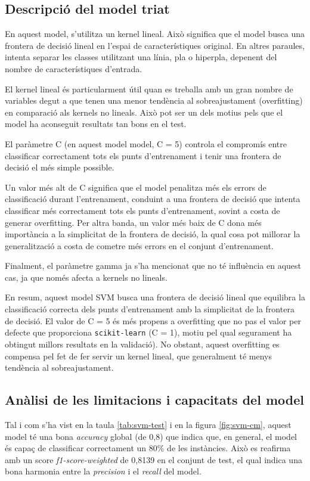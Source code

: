 \subsection{Descripció del model triat}
En aquest model, s'utilitza un kernel lineal. Això significa que el model busca una frontera de decisió lineal en l'espai de característiques original. En altres paraules, intenta separar les classes utilitzant una línia, pla o hiperpla, depenent del nombre de característiques d'entrada.

El kernel lineal és particularment útil quan es treballa amb un gran nombre de variables degut a que tenen una menor tendència al sobreajustament (overfitting) en comparació als kernels no lineals. Això pot ser un dels motius pels que el model ha aconseguit resultats tan bons en el test.

El paràmetre C (en aquest model model, C = 5) controla el compromís entre classificar correctament tots els punts d'entrenament i tenir una frontera de decisió el més simple possible.

Un valor més alt de C significa que el model penalitza més els errors de classificació durant l'entrenament, conduint a una frontera de decisió que intenta classificar més correctament tots els punts d'entrenament, sovint a costa de generar overfitting. Per altra banda, un valor més baix de C dona més importància a la simplicitat de la frontera de decisió, la qual cosa pot millorar la generalització a costa de cometre més errors en el conjunt d'entrenament.

Finalment, el paràmetre gamma ja s'ha mencionat que no té influència en aquest cas, ja que només afecta a kernels no lineals.

En resum, aquest model SVM busca una frontera de decisió lineal que equilibra la classificació correcta dels punts d'entrenament amb la simplicitat de la frontera de decisió. El valor de C = 5 és més propens a overfitting que no pas el valor per defecte que proporciona \texttt{scikit-learn} (C = 1), motiu pel qual segurament ha obtingut millors resultats en la validació). No obstant, aquest overfitting es compensa pel fet de fer servir un kernel lineal, que generalment té menys tendència al sobreajustament.

\subsection{Anàlisi de les limitacions i capacitats del model}
Tal i com s'ha vist en la taula \ref{tab:svm-test} i en la figura \ref{fig:svm-cm}, aquest model té una bona \textit{accuracy} global (de 0,8) que indica que, en general, el model és capaç de classificar correctament un 80\% de les instàncies. Això es reafirma amb un score \textit{f1-score-weighted} de 0,8139 en el conjunt de test, el qual indica una bona harmonia entre la \textit{precision} i el \textit{recall} del model.

